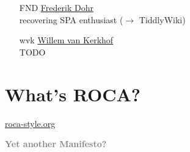 \documentclass{beamer}
\begin{document}
\begin{frame}{\insertsectionhead}
  \begin{itemize}
    \item[FND] \href{mailto:fnd@innoq.com}{Frederik Dohr} \\
        recovering SPA enthusiast (\ensuremath{\rightarrow} TiddlyWiki)
    \item[]
    \item[wvk] \href{mailto:wvk@innoq.com}{Willem van Kerkhof} \\
        TODO
  \end{itemize}


\end{frame}

\section{What's ROCA?}

{
  \begin{frame}
    \vspace*{-2.5in}
    \href{http://roca-style.org}{roca-style.org}

  \end{frame}
}

\begin{frame}
  \textcolor{gray}{
    \begin{center}
      \textbf{
        \fontsize{60}{70}\selectfont Yet another Manifesto?
      }
    \end{center}
  }

\end{frame}
\end{document}
